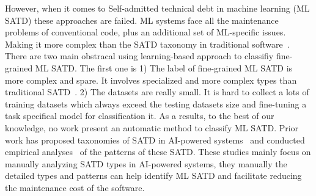 \documentclass[acmsmall,screen,review,anonymous]{acmart}
\begin{document}
However, when it comes to Self-admitted technical debt in machine learning (ML SATD) these approaches are failed.  ML systems face all the maintenance problems of conventional code, plus an additional set of ML-specific issues. Making it more complex than the SATD taxonomy in traditional software~\cite{recupito2024technical}. There are two main obstracal using learning-based approach to classifiy fine-grained ML SATD. The first one is 1) The label of fine-grained ML SATD is more complex and spare. It involves specialized and more complex types than traditional SATD~\cite{recupito2024technical}. 2) The datasets are really small. It is hard to collect a lots of training datasets which always exceed the testing datasets size and fine-tuning a task specifical model for classification it. As a results, to the best of our knowledge, no work present an automatic method to classify ML SATD. Prior work has proposed taxonomies of SATD in AI-powered systems~\cite{breck2017ml, pepe2024taxonomy} and conducted empirical analyses~\cite{alahdab2019empirical, bhatia2023empirical} of the patterns of these SATD. These studies mainly focus on manually analyzing SATD types in AI-powered systems, they manually the detailed types and patterns can help identify ML SATD and facilitate reducing the maintenance cost of the software. 






\end{document}
